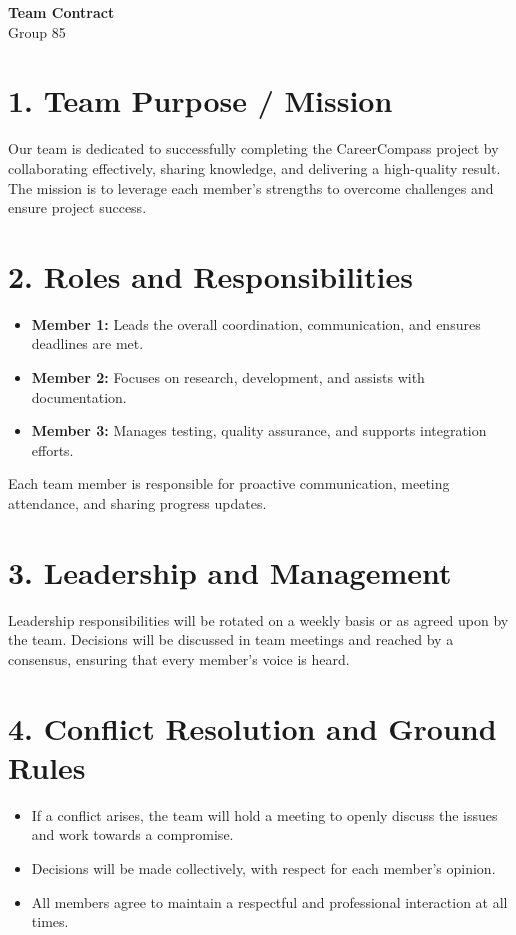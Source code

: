\documentclass[12pt]{article}
\begin{document}
\begin{center}
  {\Large\bfseries Team Contract}\\[10pt]
  {\normalsize Group 85}
\end{center}

\section*{1. Team Purpose / Mission}
Our team is dedicated to successfully completing the CareerCompass project by collaborating effectively, sharing knowledge, and delivering a high-quality result. The mission is to leverage each member's strengths to overcome challenges and ensure project success.

\section*{2. Roles and Responsibilities}
\begin{itemize}
  \item \textbf{Member 1:} Leads the overall coordination, communication, and ensures deadlines are met.
  \item \textbf{Member 2:} Focuses on research, development, and assists with documentation.
  \item \textbf{Member 3:} Manages testing, quality assurance, and supports integration efforts.
\end{itemize}
Each team member is responsible for proactive communication, meeting attendance, and sharing progress updates.

\section*{3. Leadership and Management}
Leadership responsibilities will be rotated on a weekly basis or as agreed upon by the team. Decisions will be discussed in team meetings and reached by a consensus, ensuring that every member’s voice is heard.

\section*{4. Conflict Resolution and Ground Rules}
\begin{itemize}
  \item If a conflict arises, the team will hold a meeting to openly discuss the issues and work towards a compromise.
  \item Decisions will be made collectively, with respect for each member’s opinion.
  \item All members agree to maintain a respectful and professional interaction at all times.
\end{itemize}
\end{document}
